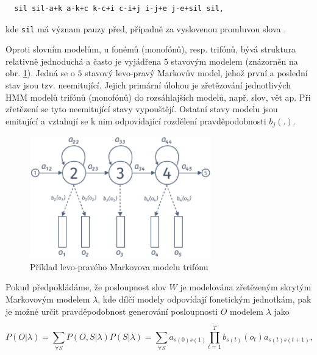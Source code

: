 \begin{verbatim}
  sil sil-a+k a-k+c k-c+i c-i+j i-j+e j-e+sil sil,
\end{verbatim}

\noindent kde \texttt{sil} má význam pauzy před, případně za vyslovenou promluvou slova .

Oproti slovním modelům, u fonémů (monofónů), resp. trifónů, bývá struktura relativně jednoduchá a často je vyjádřena $5$ stavovým modelem (znázorněn na obr. \ref{fig:asr:acoustic:hmm}). Jedná se o $5$ stavový levo-pravý Markovův model, jehož první a poslední stav jsou tzv. neemitující. Jejich primární úlohou je zřetězování jednotlivých HMM modelů trifónů (monofónů) do rozsáhlajších modelů, např. slov, vět ap. Při zřetězení se tyto neemitující stavy vypouštějí. Ostatní stavy modelu jsou emitující a vztahují se k nim odpovídající rozdělení pravděpodobnosti $b_j(.)$.

\begin{figure}[hbpt]
  \centering
  \includegraphics[width=0.7\textwidth]{./ch4-asr/img/hmm_structure.pdf}
  \caption{Příklad levo-pravého Markovova modelu trifónu}
  \label{fig:asr:acoustic:hmm}
\end{figure}

Pokud předpokládáme, že posloupnost slov $W$ je modelována zřetězeným skrytým Markovovým modelem $\lambda$, kde dílčí modely odpovídají fonetickým jednotkám, pak je možné určit pravděpodobnost generování posloupnosti $O$ modelem $\lambda$ jako

\begin{equation}
  P\left(O|\lambda\right) = \sum_{\forall S} P\left(O, S| \lambda\right)P\left(S|\lambda\right) = \sum_{\forall S} a_{s\left(0\right)s\left(1\right)} \prod_{t=1}^{T} b_{s\left(t\right)}\left(o_t\right)a_{s\left(t\right)s\left(t+1\right)},
  \label{eq:asr:acoustic:structure:output}
\end{equation}


